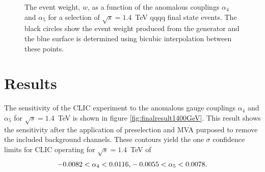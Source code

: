 \begin{figure}[h!]
\caption[The event weight, $w$, as a function of the anomalous couplings $\alpha_{4}$ and $\alpha_{5}$ for a selection of $\sqrt{s}=1.4$~TeV \nu{\nu}qqqq final state events.  The black circles show the event weight produced from the generator and the blue surface is determined using bicubic interpolation between these points.]{The event weight, $w$, as a function of the anomalous couplings $\alpha_{4}$ and $\alpha_{5}$ for a selection of $\sqrt{s}=1.4$~TeV \nu{\nu}qqqq final state events.  The black circles show the event weight produced from the generator and the blue surface is determined using bicubic interpolation between these points.}
\label{fig:eventweights1400interpolated}
\end{figure}


\section{Results}
The sensitivity of the CLIC experiment to the anomalous gauge couplings $\alpha_{4}$ and $\alpha_{5}$ for $\sqrt{s}=1.4$~TeV is shown in figure \ref{fig:finalresult1400GeV}.  This result shows the sensitivity after the application of preselection and MVA purposed to remove the included background channels.  These contours yield the one $\sigma$ confidence limits for CLIC operating for $\sqrt{s}=1.4$~TeV of
%
\begin{equation}
-0.0082 < \alpha_{4} < 0.0116 \text{,} \\
-0.0055 < \alpha_{5} < 0.0078 \text{.}
\end{equation}
%

